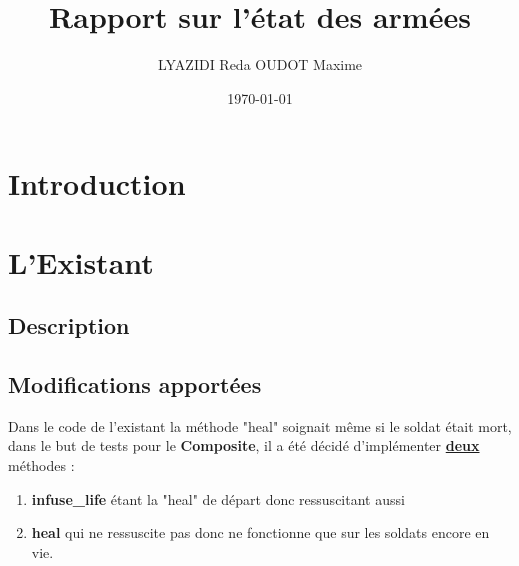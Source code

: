 \documentclass[12pt]{article}
\title{Rapport sur l'état des armées}
\author{LYAZIDI Reda  \hspace*{1cm} OUDOT Maxime}
\date{\today}
\begin{document}
\maketitle
\tableofcontents

\newpage
\section*{Introduction}

\section{L'Existant}
\subsection{Description}
\subsection{Modifications apportées}
Dans le code de l'existant la méthode "heal" soignait même si le soldat était mort,
dans le but de tests pour le \textbf{Composite}, il a été décidé d'implémenter \underline{\textbf{deux}} méthodes :
\begin{enumerate}
 \item \textbf{infuse\_life} étant la "heal" de départ donc ressuscitant aussi
 \item \textbf{heal} qui ne ressuscite pas donc ne fonctionne que sur les soldats encore en vie.
\end{enumerate}
\end{document}

